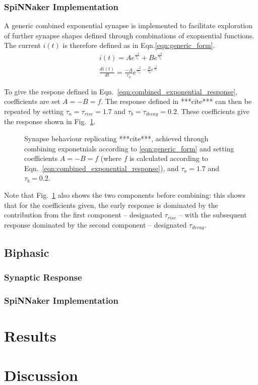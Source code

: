 \documentclass[12pt]{article}
\begin{document}
\subsubsection*{SpiNNaker Implementation}
A generic combined exponential synapse is implemented to facilitate exploration of further synapse shapes defined through combinations of exopnential functions. The current $i(t)$ is therefore defined as in Eqn.\ref{eqn:generic_form}.
\begin{eqnarray}
i(t) = Ae^{\frac{-t}{\tau_a}} + Be^{\frac{-t}{\tau_b}}\\
\frac{di(t)}{dt} = \frac{-A}{\tau_a}e^{\frac{-t}{\tau_a} - \frac{B}{\tau_b}e^{\frac{-t}{\tau_b}}}
\label{eqn:generic_form}
\end{eqnarray}

To give the respone defined in Eqn.~\ref{eqn:combined_exponential_response}, coefficients are set $A=-B=f$. The response defined in ***cite*** can then be repeated by setting $\tau_a = \tau_{rise} = 1.7$ and $\tau_b = \tau_{decay} = 0.2$. These coefficients give the response shown in Fig.~\ref{fig:typical_response}.
\begin{figure}
\caption{Synapse behaviour replicating ***cite***, achieved through combining exponetnials according to \ref{eqn:generic_form} and setting coefficients $A=-B=f$ (where $f$ is calculated according to Eqn.~\ref{eqn:combined_exponential_response}), and $\tau_a = 1.7$ and $\tau_b = 0.2$.}
\label{fig:typical_response}
\end{figure}
Note that Fig.~\ref{fig:typical_response} also shows the two components before combining: this shows that for the coefficients given, the early response is dominated by the contribution from the first component -- designated $\tau_{rise}$ -- with the subsequent response dominated by the second component -- designated $\tau_{decay}$.



\subsection{Biphasic}
\subsubsection*{Synaptic Response}
\subsubsection*{SpiNNaker Implementation}

\section{Results}

\section{Discussion}
\end{document}
